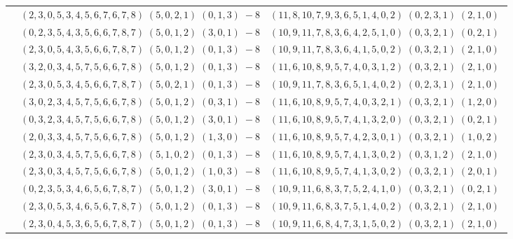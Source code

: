 \documentclass[11pt]{article}
\begin{document}
\begin{longtable}[l]{|c|c|c|}
 \cline{2-3} 
 & $(2 ,3 ,0 ,5 ,3 ,4 ,5 ,6 ,7 ,6 ,7 ,8) \;(5 ,0 ,2 ,1) \;(0 ,1 ,3) \;-8$ & $(11 ,8 ,10 ,7 ,9 ,3 ,6 ,5 ,1 ,4 ,0 ,2) \;(0 ,2 ,3 ,1) \;(2 ,1 ,0) \;$\\ 
 \cline{2-3} 
 & $(0 ,2 ,3 ,5 ,4 ,3 ,5 ,6 ,6 ,7 ,8 ,7) \;(5 ,0 ,1 ,2) \;(3 ,0 ,1) \;-8$ & $(10 ,9 ,11 ,7 ,8 ,3 ,6 ,4 ,2 ,5 ,1 ,0) \;(0 ,3 ,2 ,1) \;(0 ,2 ,1) \;$\\ 
 \cline{2-3} 
 & $(2 ,3 ,0 ,5 ,4 ,3 ,5 ,6 ,6 ,7 ,8 ,7) \;(5 ,0 ,1 ,2) \;(0 ,1 ,3) \;-8$ & $(10 ,9 ,11 ,7 ,8 ,3 ,6 ,4 ,1 ,5 ,0 ,2) \;(0 ,3 ,2 ,1) \;(2 ,1 ,0) \;$\\ 
 \cline{2-3} 
 & $(3 ,2 ,0 ,3 ,4 ,5 ,7 ,5 ,6 ,6 ,7 ,8) \;(5 ,0 ,1 ,2) \;(0 ,1 ,3) \;-8$ & $(11 ,6 ,10 ,8 ,9 ,5 ,7 ,4 ,0 ,3 ,1 ,2) \;(0 ,3 ,2 ,1) \;(2 ,1 ,0) \;$\\ 
 \cline{2-3} 
 & $(2 ,3 ,0 ,5 ,3 ,4 ,5 ,6 ,6 ,7 ,8 ,7) \;(5 ,0 ,2 ,1) \;(0 ,1 ,3) \;-8$ & $(10 ,9 ,11 ,7 ,8 ,3 ,6 ,5 ,1 ,4 ,0 ,2) \;(0 ,2 ,3 ,1) \;(2 ,1 ,0) \;$\\ 
 \cline{2-3} 
 & $(3 ,0 ,2 ,3 ,4 ,5 ,7 ,5 ,6 ,6 ,7 ,8) \;(5 ,0 ,1 ,2) \;(0 ,3 ,1) \;-8$ & $(11 ,6 ,10 ,8 ,9 ,5 ,7 ,4 ,0 ,3 ,2 ,1) \;(0 ,3 ,2 ,1) \;(1 ,2 ,0) \;$\\ 
 \cline{2-3} 
 & $(0 ,3 ,2 ,3 ,4 ,5 ,7 ,5 ,6 ,6 ,7 ,8) \;(5 ,0 ,1 ,2) \;(3 ,0 ,1) \;-8$ & $(11 ,6 ,10 ,8 ,9 ,5 ,7 ,4 ,1 ,3 ,2 ,0) \;(0 ,3 ,2 ,1) \;(0 ,2 ,1) \;$\\ 
 \cline{2-3} 
 & $(2 ,0 ,3 ,3 ,4 ,5 ,7 ,5 ,6 ,6 ,7 ,8) \;(5 ,0 ,1 ,2) \;(1 ,3 ,0) \;-8$ & $(11 ,6 ,10 ,8 ,9 ,5 ,7 ,4 ,2 ,3 ,0 ,1) \;(0 ,3 ,2 ,1) \;(1 ,0 ,2) \;$\\ 
 \cline{2-3} 
 & $(2 ,3 ,0 ,3 ,4 ,5 ,7 ,5 ,6 ,6 ,7 ,8) \;(5 ,1 ,0 ,2) \;(0 ,1 ,3) \;-8$ & $(11 ,6 ,10 ,8 ,9 ,5 ,7 ,4 ,1 ,3 ,0 ,2) \;(0 ,3 ,1 ,2) \;(2 ,1 ,0) \;$\\ 
 \cline{2-3} 
 & $(2 ,3 ,0 ,3 ,4 ,5 ,7 ,5 ,6 ,6 ,7 ,8) \;(5 ,0 ,1 ,2) \;(1 ,0 ,3) \;-8$ & $(11 ,6 ,10 ,8 ,9 ,5 ,7 ,4 ,1 ,3 ,0 ,2) \;(0 ,3 ,2 ,1) \;(2 ,0 ,1) \;$\\ 
 \cline{2-3} 
 & $(0 ,2 ,3 ,5 ,3 ,4 ,6 ,5 ,6 ,7 ,8 ,7) \;(5 ,0 ,1 ,2) \;(3 ,0 ,1) \;-8$ & $(10 ,9 ,11 ,6 ,8 ,3 ,7 ,5 ,2 ,4 ,1 ,0) \;(0 ,3 ,2 ,1) \;(0 ,2 ,1) \;$\\ 
 \cline{2-3} 
 & $(2 ,3 ,0 ,5 ,3 ,4 ,6 ,5 ,6 ,7 ,8 ,7) \;(5 ,0 ,1 ,2) \;(0 ,1 ,3) \;-8$ & $(10 ,9 ,11 ,6 ,8 ,3 ,7 ,5 ,1 ,4 ,0 ,2) \;(0 ,3 ,2 ,1) \;(2 ,1 ,0) \;$\\ 
 \cline{2-3} 
 & $(2 ,3 ,0 ,4 ,5 ,3 ,6 ,5 ,6 ,7 ,8 ,7) \;(5 ,0 ,1 ,2) \;(0 ,1 ,3) \;-8$ & $(10 ,9 ,11 ,6 ,8 ,4 ,7 ,3 ,1 ,5 ,0 ,2) \;(0 ,3 ,2 ,1) \;(2 ,1 ,0) \;$\\ 

\end{longtable}
\end{document}
